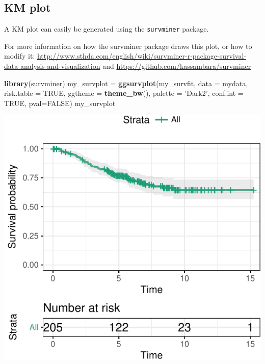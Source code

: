 \documentclass[12pt,]{krantz}
\makeatletter
\newenvironment{Shaded}{\begin{snugshade}}{\end{snugshade}}
\newcommand{\CommentTok}[1]{\textcolor[rgb]{0.56,0.35,0.01}{\textit{#1}}}
\newcommand{\DataTypeTok}[1]{\textcolor[rgb]{0.13,0.29,0.53}{#1}}
\newcommand{\KeywordTok}[1]{\textcolor[rgb]{0.13,0.29,0.53}{\textbf{#1}}}
\newcommand{\NormalTok}[1]{#1}
\newcommand{\OtherTok}[1]{\textcolor[rgb]{0.56,0.35,0.01}{#1}}
\newcommand{\StringTok}[1]{\textcolor[rgb]{0.31,0.60,0.02}{#1}}
\newenvironment{kframe}{%
\medskip{}
\setlength{\fboxsep}{.8em}
 \def\at@end@of@kframe{}%
 \ifinner\ifhmode%
  \def\at@end@of@kframe{\end{minipage}}%
  \begin{minipage}{\columnwidth}%
 \fi\fi%
 \def\FrameCommand##1{\hskip\@totalleftmargin \hskip-\fboxsep
 \colorbox{shadecolor}{##1}\hskip-\fboxsep
     \hskip-\linewidth \hskip-\@totalleftmargin \hskip\columnwidth}%
 \MakeFramed {\advance\hsize-\width
   \@totalleftmargin\z@ \linewidth\hsize
   \@setminipage}}%
 {\par\unskip\endMakeFramed%
 \at@end@of@kframe}
\renewenvironment{Shaded}{\begin{kframe}}{\end{kframe}}
\theoremstyle{definition}
\theoremstyle{definition}
\theoremstyle{definition}
\theoremstyle{remark}
\makeatother
\begin{document}
\begin{Shaded}
\end{Shaded}

\hypertarget{km-plot}{%
\subsection{KM plot}\label{km-plot}}

A KM plot can easily be generated using the \texttt{survminer} package.

For more information on how the survminer package draws this plot, or
how to modify it:
\url{http://www.sthda.com/english/wiki/survminer-r-package-survival-data-analysis-and-visualization}
and \url{https://github.com/kassambara/survminer}

\begin{Shaded}
\begin{Highlighting}[]
\KeywordTok{library}\NormalTok{(survminer)}
\NormalTok{my_survplot =}\StringTok{ }\KeywordTok{ggsurvplot}\NormalTok{(my_survfit, }\DataTypeTok{data =}\NormalTok{ mydata,                 }
           \DataTypeTok{risk.table =} \OtherTok{TRUE}\NormalTok{,}
           \DataTypeTok{ggtheme =} \KeywordTok{theme_bw}\NormalTok{(),}
           \DataTypeTok{palette =} \StringTok{'Dark2'}\NormalTok{,}
           \DataTypeTok{conf.int =} \OtherTok{TRUE}\NormalTok{,}
           \DataTypeTok{pval=}\OtherTok{FALSE}\NormalTok{)}
\NormalTok{my_survplot}
\end{Highlighting}
\end{Shaded}

\includegraphics{10_survival_files/figure-latex/unnamed-chunk-5-1.pdf}
\end{document}
